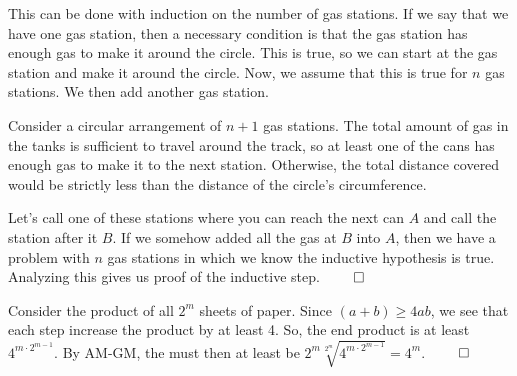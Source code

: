 \documentclass{report}
\begin{document}
\sol This can be done with induction on the number of gas stations. If we say that we have one gas station, then a necessary condition is that the gas station has enough gas to make it around the circle. This is true, so we can start at the gas station and make it around the circle. Now, we assume that this is true for $n$ gas stations. We then add another gas station. 

Consider a circular arrangement of $n+1$ gas stations. The total amount of gas in the tanks is sufficient to travel around the track, so at least one of the cans has enough gas to make it to the next station. Otherwise, the total distance covered would be strictly less than the distance of the circle's circumference. 

Let's call one of these stations where you can reach the next can $A$ and call the station after it $B$. If we somehow added all the gas at $B$ into $A$, then we have a problem with $n$ gas stations in which we know the inductive hypothesis is true. Analyzing this gives us proof of the inductive step. $\qed$


\sol Consider the product of all $2^m$ sheets of paper. Since $(a+b) \geq 4ab$, we see that each step increase the product by at least 4. So, the end product is at least $4^{m\cdot 2^{m-1}}$. By AM-GM, the must then at least be $2^m \sqrt[2^m]{4^{m\cdot 2^{m-1}}} = 4^m$. $\qed$
\end{document}
